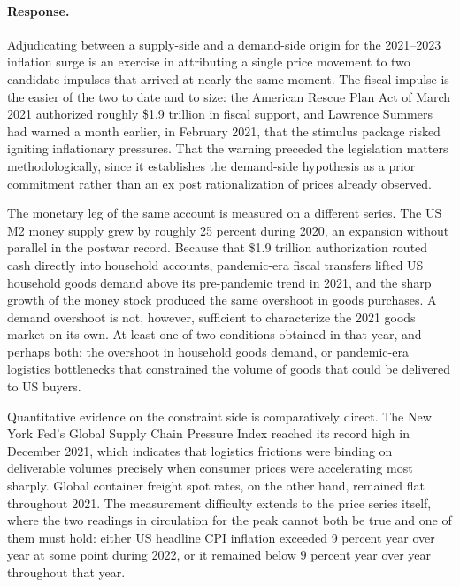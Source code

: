 \documentclass[11pt]{article}
\begin{document}
\paragraph{Response.} {\small Adjudicating between a supply-side and a demand-side origin for the 2021–2023 inflation surge is an exercise in attributing a single price movement to two candidate impulses that arrived at nearly the same moment. The fiscal impulse is the easier of the two to date and to size: the American Rescue Plan Act of March 2021 authorized roughly \$1.9 trillion in fiscal support, and Lawrence Summers had warned a month earlier, in February 2021, that the stimulus package risked igniting inflationary pressures. That the warning preceded the legislation matters methodologically, since it establishes the demand-side hypothesis as a prior commitment rather than an ex post rationalization of prices already observed.

The monetary leg of the same account is measured on a different series. The US M2 money supply grew by roughly 25 percent during 2020, an expansion without parallel in the postwar record. Because that \$1.9 trillion authorization routed cash directly into household accounts, pandemic-era fiscal transfers lifted US household goods demand above its pre-pandemic trend in 2021, and the sharp growth of the money stock produced the same overshoot in goods purchases. A demand overshoot is not, however, sufficient to characterize the 2021 goods market on its own. At least one of two conditions obtained in that year, and perhaps both: the overshoot in household goods demand, or pandemic-era logistics bottlenecks that constrained the volume of goods that could be delivered to US buyers.

Quantitative evidence on the constraint side is comparatively direct. The New York Fed's Global Supply Chain Pressure Index reached its record high in December 2021, which indicates that logistics frictions were binding on deliverable volumes precisely when consumer prices were accelerating most sharply. Global container freight spot rates, on the other hand, remained flat throughout 2021. The measurement difficulty extends to the price series itself, where the two readings in circulation for the peak cannot both be true and one of them must hold: either US headline CPI inflation exceeded 9 percent year over year at some point during 2022, or it remained below 9 percent year over year throughout that year.

}
\end{document}
